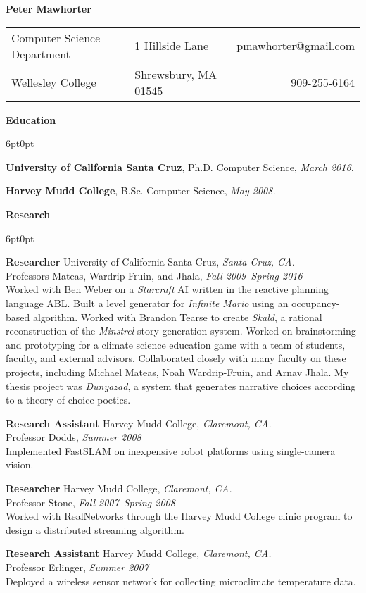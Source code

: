 \documentclass[11pt]{article}
\newenvironment{sct}[1]{%
  \vspace{8pt}\textbf{\Large #1} \hrulefill\vspace{6pt}
  \begin{adjustwidth}{6pt}{0pt}
}{%
  \end{adjustwidth}
}
\newcommand{\work}[1]{\textit{#1}\xspace}
\newcommand{\edu}[3]{\textbf{#1}, #2, \textit{#3.}}
\newcommand{\experience}[6]{%
  \textbf{#1} #2, \textit{#3.} \\
  #4, \textit{#5} \vspace{6pt} \\
  #6 \vspace{8pt}
}
\begin{document}
\textbf{\huge Peter Mawhorter }\hrulefill\vspace{6pt}

\begin{tabularx}{\textwidth}{X X r}
Computer Science Department & 1 Hillside Lane & pmawhorter@gmail.com \\
Wellesley College & Shrewsbury, MA 01545 & 909-255-6164 \\
\end{tabularx}

\begin{sct}{Education}

\edu{University of California Santa Cruz}{Ph.D. Computer Science}{March 2016}

\edu{Harvey Mudd College}{B.Sc. Computer Science}{May 2008}

\end{sct}

\begin{sct}{Research}

\experience{Researcher}{University of California Santa Cruz}{Santa Cruz, CA}%
{Professors Mateas, Wardrip-Fruin, and Jhala}{Fall 2009--Spring 2016}{
Worked with Ben Weber on a \work{Starcraft} AI written in the reactive planning
language ABL. Built a level generator for \work{Infinite Mario} using an
occupancy-based algorithm. Worked with Brandon Tearse to create \work{Skald}, a
rational reconstruction of the \work{Minstrel} story generation system. Worked
on brainstorming and prototyping for a climate science education game with a
team of students, faculty, and external advisors. Collaborated closely with
many faculty on these projects, including Michael Mateas, Noah Wardrip-Fruin,
and Arnav Jhala. My thesis project was \work{Dunyazad}, a system that generates
narrative choices according to a theory of choice poetics.
}

\experience{Research Assistant}{Harvey Mudd College}{Claremont, CA}%
{Professor Dodds}{Summer 2008}{
Implemented FastSLAM on inexpensive robot platforms using single-camera vision.
}

\experience{Researcher}{Harvey Mudd College}{Claremont, CA}%
{Professor Stone}{Fall 2007--Spring 2008}{
Worked with RealNetworks through the Harvey Mudd College clinic program to
design a distributed streaming algorithm.
}

\experience{Research Assistant}{Harvey Mudd College}{Claremont, CA}%
{Professor Erlinger}{Summer 2007}{
Deployed a wireless sensor network for collecting microclimate temperature data.
}

\end{sct}
\end{document}

